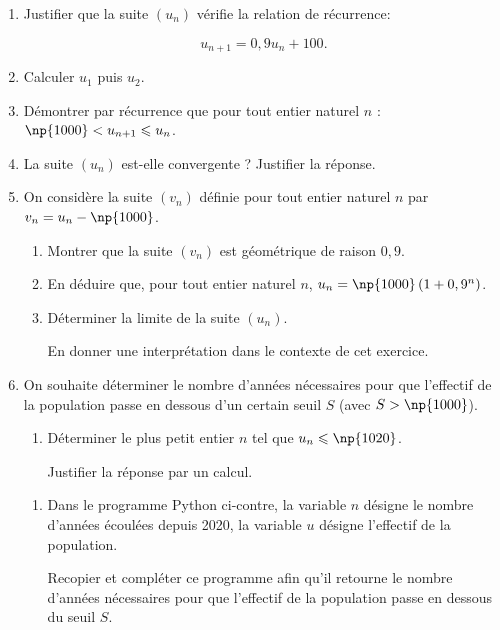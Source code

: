 \documentclass[10pt,a4paper]{article}
\begin{document}
\begin{enumerate}
\item Justifier que la suite $\left(u_n\right)$ vérifie la relation de récurrence:

\[u_{n+1} = 0,9u_n + 100.\]

\item Calculer $u_1$ puis $u_2$.
\item Démontrer par récurrence que pour tout entier naturel $n$ :\: $\np{1000} < u_{n+1}  \leqslant u_n$.
\item La suite $\left(u_n\right)$ est-elle convergente ? Justifier la réponse.
\item On considère la suite $\left(v_n\right)$ définie pour tout entier naturel $n$ par $v_n = u_n - \np{1000}$.
	\begin{enumerate}
		\item Montrer que la suite $\left(v_n\right)$ est géométrique de raison $0,9$.
		\item En déduire que, pour tout entier naturel $n$,\: $u_n = \np{1000} \left(1 + 0,9^n\right)$.
		\item Déterminer la limite de la suite $\left(u_n\right)$.
		
En donner une interprétation dans le contexte de cet exercice.
	\end{enumerate}

\item On souhaite déterminer le nombre d'années nécessaires pour que l'effectif de la population passe en dessous d'un certain seuil $S$ (avec $S > \np{1000}$).
	\begin{enumerate}
		\item Déterminer le plus petit entier $n$ tel que $u_n \leqslant \np{1020}$.

Justifier la réponse par un calcul.
	\end{enumerate}
\begin{minipage}{0.58\linewidth}
	\begin{enumerate}[resume]
		\item Dans le programme Python ci-contre, la variable $n$ désigne le nombre d'années écoulées depuis 2020, la variable $u$ désigne l'effectif de la population. 
		
Recopier et compléter ce programme afin qu'il retourne le nombre d'années nécessaires pour que l'effectif de la population passe en dessous du seuil $S$.
	\end{enumerate}


\end{minipage}
\end{enumerate}
\end{document}
